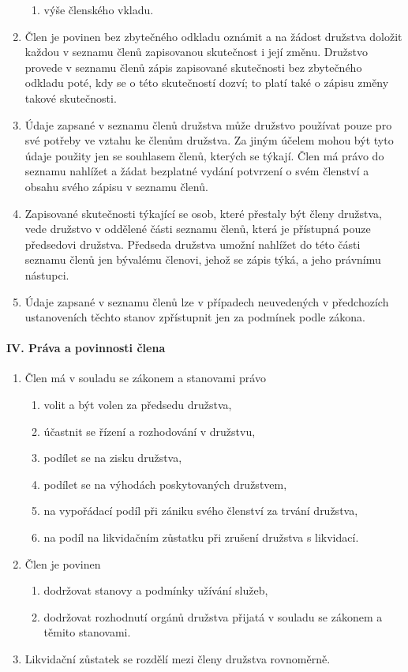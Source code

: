 \begin{enumerate}
\begin{enumerate}[label=\alph*.]
        \item výše členského vkladu.
    \end{enumerate}
    \item Člen je povinen bez zbytečného odkladu oznámit a na žádost družstva doložit každou v seznamu členů zapisovanou skutečnost i její změnu. Družstvo provede v seznamu členů zápis zapisované skutečnosti bez zbytečného odkladu poté, kdy se o této skutečností dozví; to platí také o zápisu změny takové skutečnosti.
    \item Údaje zapsané v seznamu členů družstva může družstvo používat pouze pro své potřeby ve vztahu ke členům družstva. Za jiným účelem mohou být tyto údaje použity jen se souhlasem členů, kterých se týkají. Člen má právo do seznamu nahlížet a žádat bezplatné vydání potvrzení o svém členství a obsahu svého zápisu v seznamu členů.
    \item Zapisované skutečnosti týkající se osob, které přestaly být členy družstva, vede družstvo v oddělené části seznamu členů, která je přístupná pouze předsedovi družstva. Předseda družstva umožní nahlížet do této části seznamu členů jen bývalému členovi, jehož se zápis týká, a jeho právnímu nástupci.
    \item Údaje zapsané v seznamu členů lze v případech neuvedených v předchozích ustanoveních těchto stanov zpřístupnit jen za podmínek podle zákona.
\end{enumerate}

\paragraph{IV. Práva a povinnosti člena}
\begin{enumerate}
    \item Člen má v souladu se zákonem a stanovami právo
    \begin{enumerate}[label=\alph*.]
        \item volit a být volen za předsedu družstva,
        \item účastnit se řízení a rozhodování v družstvu,
        \item podílet se na zisku družstva,
        \item podílet se na výhodách poskytovaných družstvem,
        \item na vypořádací podíl při zániku svého členství za trvání družstva,
        \item na podíl na likvidačním zůstatku při zrušení družstva s likvidací.
    \end{enumerate}
    \item Člen je povinen
    \begin{enumerate}[label=\alph*.]
        \item dodržovat stanovy a podmínky užívání služeb,
        \item dodržovat rozhodnutí orgánů družstva přijatá v souladu se zákonem a těmito stanovami.
    \end{enumerate}
        \item Likvidační zůstatek se rozdělí mezi členy družstva rovnoměrně.
\end{enumerate}

